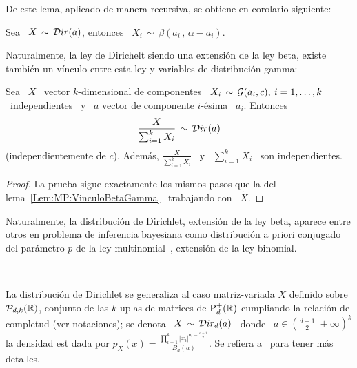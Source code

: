 De este lema, aplicado de manera recursiva, se obtiene en corolario siguiente:
%
\begin{corolario}
\label{Cor:MP:MarginalDirichletBeta}
%
  Sea  \ $X  \,  \sim \,  \mathcal{D}ir(a)$, entonces  \  $\displaystyle X_i  \, \sim  \,
  \beta\left( a_i \, , \, \alpha-a_i \right)$.
\end{corolario}

Naturalmente, la ley de Dirichelt siendo  una extensi\'on de la ley beta, existe
tambi\'en un v\'inculo entre esta ley y variables de distribuci\'on gamma:
%
\begin{lema}
\label{Lem:MP:VinculoDirichletGamma}
%
Sea \ $X$  \ vector $k$-dimensional de componentes \ $X_i  \, \sim \, \mathcal{G}(a_i,c),
\:  i  = 1,  \ldots  , k$  \  independientes  \ y  \  $a$  vector de  componente
$i$-\'esima \ $a_i$. Entonces
  \[
  \frac{X}{\sum_{i=1}^k X_i} \, \sim \, \mathcal{D}ir(a)
  \]
  (independientemente  de $c$).   Adem\'as, $\frac{X}{\sum_{i=1}^k  X_i}$ \  y \
  $\sum_{i=1}^k X_i$ \ son independientes.
\end{lema}
%
\begin{proof}
  La    prueba   sigue    exactamente   los    mismos   pasos    que    la   del
  lema~\ref{Lem:MP:VinculoBetaGamma} \ trabajando con \ $\widetilde{X}$.
\end{proof}

Naturalmente,  la  distribuci\'on de  Dirichlet,  extensi\'on  de  la ley  beta,
aparece entre  otros en problema  de inferencia bayesiana como  distribuci\'on a
priori  conjugado  del  par\'ametro  $p$  de  la  ley  multinomial~\cite{Rob07},
extensi\'on de la ley binomial.


\

La distribuci\'on de Dirichlet se generaliza al caso matriz-variada $X$ definido
sobre $\mathcal{P}_{d,k}(\mathbb{R})$,  conjunto de las  $k$-uplas de matrices  de $\mathrm{P}_d^+(\mathbb{R})$
cumpliando la relaci\'on  de completud (ver notaciones); se denota  \ $X \, \sim
\, \mathcal{D}ir_d(a)$  \ donde \  $a \in \left(  \frac{d-1}{2} \; +\infty  \right)^k$ la
densidad  est dada por  $\displaystyle p_X(x)  = \frac{\prod_{i=1}^k  \left| x_i
  \right|^{a_i-\frac{d+1}{2}}}{B_d(a)}$.   Se  refiera a~\cite[Cap.~6]{GupNag99}
para tener m\'as detalles.